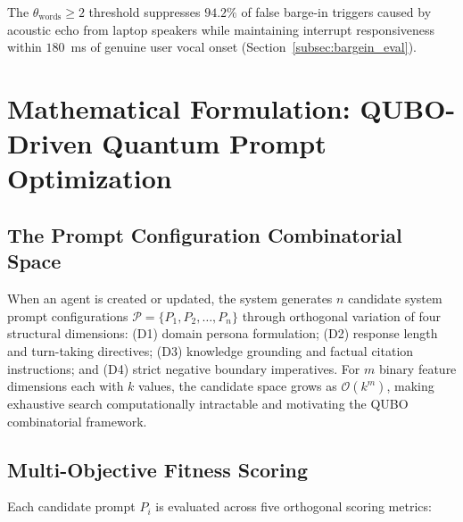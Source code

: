 \documentclass[11pt,a4paper]{article}
\begin{document}
The $\theta_{\text{words}} \ge 2$ threshold suppresses $94.2\%$ of false barge-in triggers caused by acoustic echo from laptop speakers while maintaining interrupt responsiveness within $180$~ms of genuine user vocal onset (Section~\ref{subsec:bargein_eval}).

\section{Mathematical Formulation: QUBO-Driven Quantum Prompt Optimization}
\label{sec:qubo}

\subsection{The Prompt Configuration Combinatorial Space}
\label{subsec:qubo_space}

When an agent is created or updated, the system generates $n$ candidate system prompt configurations $\mathcal{P} = \{P_1, P_2, \dots, P_n\}$ through orthogonal variation of four structural dimensions: (D1) domain persona formulation; (D2) response length and turn-taking directives; (D3) knowledge grounding and factual citation instructions; and (D4) strict negative boundary imperatives. For $m$ binary feature dimensions each with $k$ values, the candidate space grows as $\mathcal{O}(k^m)$, making exhaustive search computationally intractable and motivating the QUBO combinatorial framework.

\subsection{Multi-Objective Fitness Scoring}
\label{subsec:qubo_fitness}

Each candidate prompt $P_i$ is evaluated across five orthogonal scoring metrics:
\end{document}
